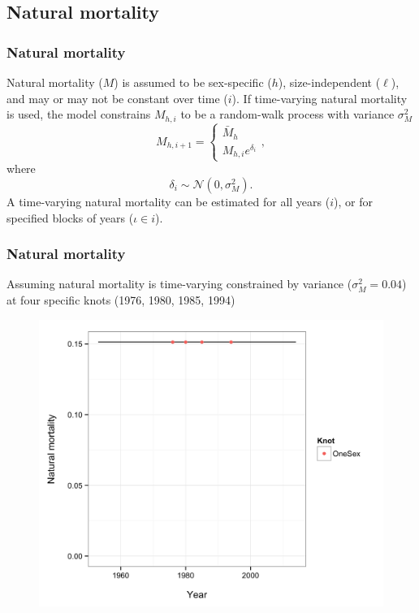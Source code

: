 \documentclass{beamer}
\begin{document}

\subsection{Natural mortality}
\begin{frame}
\frametitle{Natural mortality}
Natural mortality ($M$) is assumed to be sex-specific ($h$), size-independent
($\ell$), and may or may not be constant over time ($i$). If time-varying
natural mortality is used, the model constrains $M_{h,i}$ to be a random-walk
process with variance $\sigma^2_M$
\begin{equation*}
  M_{h,i+1} = 
  \begin{cases}
    \bar{M}_h\\
    M_{h,i} e^{\delta_i}
  \end{cases},
\end{equation*}
where
\begin{equation*}
  \delta_i \sim \mathcal{N} \left( 0, \sigma^2_M \right).
\end{equation*}
A time-varying natural mortality can be estimated for all years ($i$), or for
specified blocks of years ($\iota \in i$).
\end{frame}


\begin{frame}
\frametitle{Natural mortality}
Assuming natural mortality is time-varying constrained by variance ($\sigma^2_M
= 0.04$) at four specific knots (1976, 1980, 1985, 1994)
\begin{figure}[!htbp]
  \centering
  \includegraphics[width=0.65\linewidth]{../../examples/bbrkc/OneSex/figure/M_t.png}
\end{figure}
\end{frame}
\end{document}

